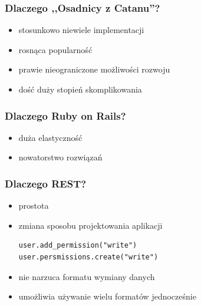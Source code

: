 \documentclass[12pt]{beamer}
\begin{document}
\begin{frame}
  \frametitle{Dlaczego ,,Osadnicy z Catanu''?}
  \begin{itemize}
  \item stosunkowo niewiele implementacji
  \item rosnąca popularność
  \item prawie nieograniczone możliwości rozwoju
  \item dość duży stopień skomplikowania
  \end{itemize}
\end{frame}

\begin{frame}
  \frametitle{Dlaczego Ruby on Rails?}
  \begin{itemize}
  \item duża elastyczność
  \item nowatorstwo rozwiązań
  \end{itemize}
\end{frame}

\begin{frame}[fragile]
  \frametitle{Dlaczego REST?}
  \begin{itemize}
  \item prostota
  \item zmiana sposobu projektowania aplikacji
\begin{verbatim}
user.add_permission("write")
user.persmissions.create("write")
\end{verbatim}
  \item nie narzuca formatu wymiany danych
  \item umożliwia używanie wielu formatów jednocześnie
  \end{itemize}
\end{frame}
\end{document}
